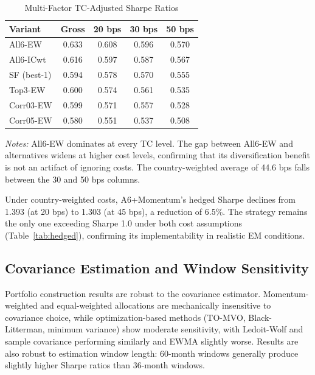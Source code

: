 \documentclass[12pt]{article}
\begin{document}
\begin{table}[H]
\centering
\caption{Multi-Factor TC-Adjusted Sharpe Ratios}
\label{tab:mf_tc_robust}
\small
\begin{tabular}{lcccc}
\toprule
\textbf{Variant} & \textbf{Gross} & \textbf{20 bps} & \textbf{30 bps} & \textbf{50 bps} \\
\midrule
All6-EW     & 0.633 & 0.608 & 0.596 & 0.570 \\
All6-ICwt   & 0.616 & 0.597 & 0.587 & 0.567 \\
SF (best-1) & 0.594 & 0.578 & 0.570 & 0.555 \\
Top3-EW     & 0.600 & 0.574 & 0.561 & 0.535 \\
Corr03-EW   & 0.599 & 0.571 & 0.557 & 0.528 \\
Corr05-EW   & 0.580 & 0.551 & 0.537 & 0.508 \\
\bottomrule
\end{tabular}
\begin{minipage}{0.92\textwidth}
\vspace{0.3em}
\footnotesize
\textit{Notes:} All6-EW dominates at every TC level. The gap between All6-EW and alternatives widens at higher cost levels, confirming that its diversification benefit is not an artifact of ignoring costs. The country-weighted average of 44.6 bps falls between the 30 and 50 bps columns.
\end{minipage}
\end{table}

Under country-weighted costs, A6+Momentum's hedged Sharpe declines from 1.393 (at 20 bps) to 1.303 (at 45 bps), a reduction of 6.5\%. The strategy remains the only one exceeding Sharpe 1.0 under both cost assumptions (Table~\ref{tab:hedged}), confirming its implementability in realistic EM conditions.

\subsection{Covariance Estimation and Window Sensitivity}

Portfolio construction results are robust to the covariance estimator. Momentum-weighted and equal-weighted allocations are mechanically insensitive to covariance choice, while optimization-based methods (TO-MVO, Black-Litterman, minimum variance) show moderate sensitivity, with Ledoit-Wolf and sample covariance performing similarly and EWMA slightly worse. Results are also robust to estimation window length: 60-month windows generally produce slightly higher Sharpe ratios than 36-month windows.
\end{document}
